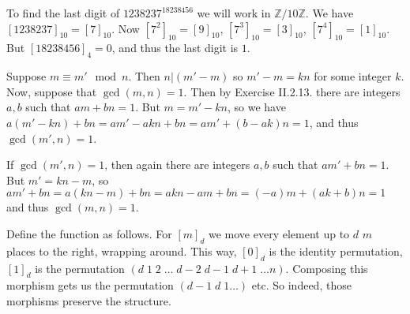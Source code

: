 \begin{problem}
\end{problem}

\begin{solution}
	To find the last digit of $1238237^{18238456}$ we will work in $\mathbb{Z}/10\mathbb{Z}$. We have $[1238237]_{10}=[7]_{10}$. Now $[7^2]_{10}=[9]_{10}$, $[7^3]_{10}=[3]_{10}$, $[7^4]_{10}=[1]_{10}$. But $[18238456]_{4}=0$, and thus the last digit is $1$.	
\end{solution}

\begin{problem}
\end{problem}

\begin{solution}
	Suppose $m \equiv m' \mod n$. Then $n | (m' - m)$ so $m' - m = kn$ for some integer $k$. Now, suppose that $\gcd(m,n)=1$. Then by Exercise II.2.13. there are integers $a,b$ such that $am+bn=1$. But $m = m' - kn$, so we have $a(m' - kn)+bn=am'-akn+bn=am'+(b-ak)n=1$, and thus $\gcd(m',n)=1$. 
	
	If $\gcd(m',n)=1$, then again there are integers $a,b$ such that $am'+bn=1$. But $m' = kn - m$, so $am'+bn=a(kn - m) + bn=akn-am+bn=(-a)m+(ak+b)n=1$ and thus $\gcd(m,n)=1$.
\end{solution}

\begin{problem}
\end{problem}

\begin{solution}
	Define the function as follows. For $[m]_d$ we move every element up to $d$ $m$ places to the right, wrapping around. This way, $[0]_d$ is the identity permutation, $[1]_d$ is the permutation $(d\;1\;2\;\dots\;d-2\;d-1\;d+1\;\dots n)$. Composing this morphism gets us the permutation $(d-1\;d\;1\dots)$ etc. So indeed, those morphisms preserve the structure.
\end{solution}

\begin{problem}
\end{problem}

